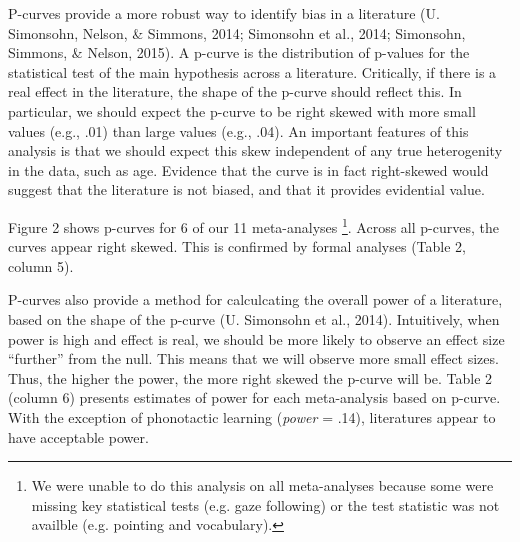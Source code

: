 \documentclass[american,floatsintext,man]{apa6}
\begin{document}
P-curves provide a more robust way to identify bias in a literature (U.
Simonsohn, Nelson, \& Simmons, 2014; Simonsohn et al., 2014; Simonsohn,
Simmons, \& Nelson, 2015). A p-curve is the distribution of p-values for
the statistical test of the main hypothesis across a literature.
Critically, if there is a real effect in the literature, the shape of
the p-curve should reflect this. In particular, we should expect the
p-curve to be right skewed with more small values (e.g., .01) than large
values (e.g., .04). An important features of this analysis is that we
should expect this skew independent of any true heterogenity in the
data, such as age. Evidence that the curve is in fact right-skewed would
suggest that the literature is not biased, and that it provides
evidential value.

Figure 2 shows p-curves for 6 of our 11 meta-analyses
\footnote{We were unable to do this analysis on all meta-analyses because some were missing key statistical tests (e.g. gaze following) or the test statistic was not availble (e.g. pointing and vocabulary).}.
Across all p-curves, the curves appear right skewed. This is confirmed
by formal analyses (Table 2, column 5).

P-curves also provide a method for calculcating the overall power of a
literature, based on the shape of the p-curve (U. Simonsohn et al.,
2014). Intuitively, when power is high and effect is real, we should be
more likely to observe an effect size \enquote{further} from the null.
This means that we will observe more small effect sizes. Thus, the
higher the power, the more right skewed the p-curve will be. Table 2
(column 6) presents estimates of power for each meta-analysis based on
p-curve. With the exception of phonotactic learning (\emph{power} =
.14), literatures appear to have acceptable power.
\end{document}
